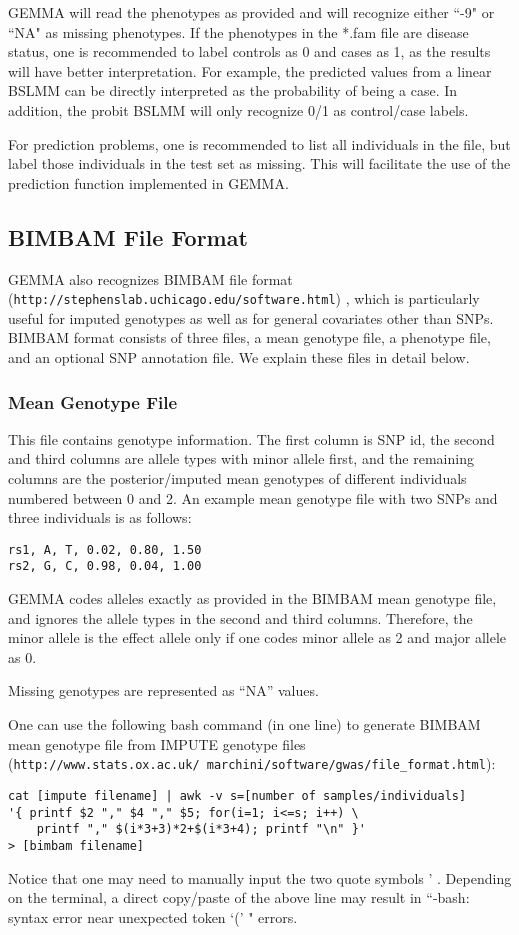 \documentclass[11pt]{article}
\providecommand{\url}[1]{\texttt{#1}}
\begin{document}
GEMMA will read the phenotypes as provided and will recognize either
``-9" or ``NA" as missing phenotypes. If the phenotypes in the *.fam
file are disease status, one is recommended to label controls as 0 and
cases as 1, as the results will have better interpretation. For
example, the predicted values from a linear BSLMM can be directly
interpreted as the probability of being a case.  In addition, the
probit BSLMM will only recognize 0/1 as control/case labels.

For prediction problems, one is recommended to list all individuals in
the file, but label those individuals in the test set as missing. This
will facilitate the use of the prediction function implemented in
GEMMA.

\subsection{BIMBAM File Format}

GEMMA also recognizes BIMBAM file format
(\url{http://stephenslab.uchicago.edu/software.html})
\cite{Guan:2008}, which is particularly useful for imputed genotypes
as well as for general covariates other than SNPs. BIMBAM format
consists of three files, a mean genotype file, a phenotype file, and
an optional SNP annotation file. We explain these files in detail
below.

\subsubsection{Mean Genotype File}

This file contains genotype information. The first column is SNP id,
the second and third columns are allele types with minor allele first,
and the remaining columns are the posterior/imputed mean genotypes of
different individuals numbered between 0 and 2. An example mean
genotype file with two SNPs and three individuals is as follows:
%
\begin{verbatim}
rs1, A, T, 0.02, 0.80, 1.50
rs2, G, C, 0.98, 0.04, 1.00
\end{verbatim}
%
GEMMA codes alleles exactly as provided in the BIMBAM mean genotype file, and
ignores the allele types in the second and third columns. Therefore,
the minor allele is the effect allele only if one codes minor allele
as 2 and major allele as 0.

Missing genotypes are represented as ``NA'' values.

One can use the following bash command (in one line) to generate
BIMBAM mean genotype file from IMPUTE genotype files \\
(\url{http://www.stats.ox.ac.uk/~marchini/software/gwas/file_format.html})\cite{Howie:2009}:
%
\begin{verbatim}
cat [impute filename] | awk -v s=[number of samples/individuals]
'{ printf $2 "," $4 "," $5; for(i=1; i<=s; i++) \
    printf "," $(i*3+3)*2+$(i*3+4); printf "\n" }'
> [bimbam filename]
\end{verbatim}
%
Notice that one may need to manually input the two quote symbols '
. Depending on the terminal, a direct copy/paste of the above line may
result in ``-bash: syntax error near unexpected token `(' " errors.
\end{document}
